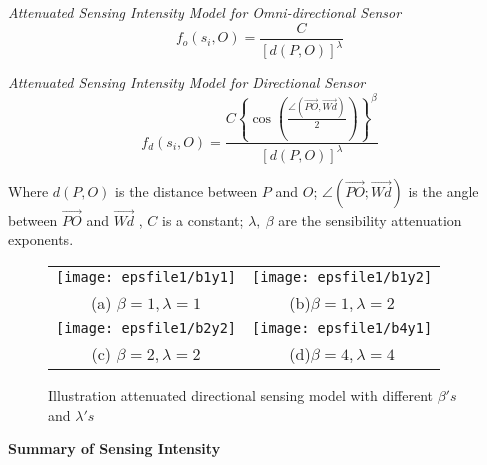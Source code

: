 \documentclass[final]{elsarticle}
\begin{document}
\textit{Attenuated Sensing Intensity Model for Omni-directional Sensor}\\
\begin{equation}
\label{eqfo}
f_o({s_i},O) = \frac{C}{{{{\left[ {d(P,O)} \right]}^\lambda }}}
\end{equation}

\textit{Attenuated Sensing Intensity Model for Directional Sensor}\\
\begin{equation}
\label{eqfd}
f_d({s_i},O) = \frac{{C{{\left\{ {\cos \left( {\frac{{\angle (\overrightarrow {PO} ,\overrightarrow {Wd}) }}{2}} \right)} \right\}}^\beta }}}{{{{\left[ {d(P,O)} \right]}^\lambda }}}
\end{equation}

Where $ d(P, O) $ is the distance between $ P $ and $ O $; $ \angle (\overrightarrow {PO}; \overrightarrow {Wd})$ is the angle between $ \overrightarrow {PO} $ and $ \overrightarrow {Wd}$ , $C$ is a constant; $ \lambda,\ \beta $ are the sensibility attenuation exponents. 

\begin{figure*}[htbp!]
	\begin{tabular}{cc}
		\texttt{[image: epsfile1/b1y1]}&\texttt{[image: epsfile1/b1y2]}\\
		(a) $\beta =1, \lambda=1 $ &(b)$ \beta=1, \lambda=2 $\\
		\texttt{[image: epsfile1/b2y2]}&\texttt{[image: epsfile1/b4y1]}\\
		(c) $ \beta=2, \lambda=2 $& (d)$ \beta=4, \lambda=4 $\\
	\end{tabular}
	\centering
	\caption{Illustration attenuated directional sensing model with different $ \beta's $ and $ \lambda's $
	}
	\label{Fig.2}       %
\end{figure*}

\textbf{Summary of Sensing Intensity}

%
\end{document}

